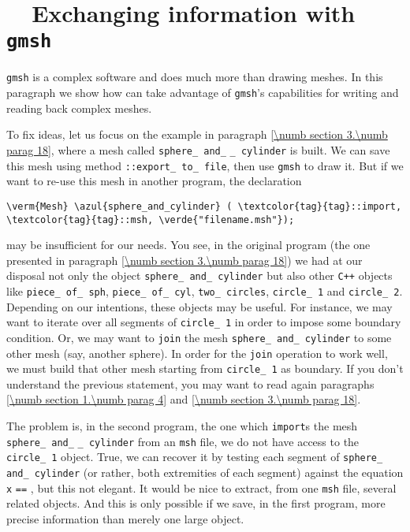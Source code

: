 \section{~~Exchanging information with {\tt gmsh}}\label{\numb section 8.\numb parag 2}

{\small\tt gmsh} is a complex software and does much more than drawing meshes.
In this paragraph we show how {\maniFEM} can take advantage of {\small\tt gmsh}'s capabilities
for writing and reading back complex meshes.

To fix ideas, let us focus on the example in paragraph \ref{\numb section 3.\numb parag 18},
where a mesh called {\small\tt sphere\_\,and\_} {\small\tt\_\,cylinder} is built.
We can save this mesh using method {\small\tt{}::export\_\,to\_\,file}, then use
{\small\tt gmsh} to draw it.
But if we want to re-use this mesh in another {\maniFEM} program, the declaration

\begin{Verbatim}[commandchars=\\\{\},formatcom=\small\tt,
   baselinestretch=0.94,framesep=2mm                     ]
   \verm{Mesh} \azul{sphere_and_cylinder} ( \textcolor{tag}{tag}::import, \textcolor{tag}{tag}::msh, \verde{"filename.msh"});
\end{Verbatim}

\noindent may be insufficient for our needs.
You see, in the original program (the one presented in paragraph
\ref{\numb section 3.\numb parag 18}) we had at our disposal not only the {\small\tt{}}
object {\small\tt sphere\_\,and\_\,cylinder} but also other {\tt C++} objects like
{\small\tt piece\_\,of\_\,sph}, {\small\tt piece\_\,of\_\,cyl}, {\small\tt two\_\,circles},
{\small\tt circle\_\,1} and {\small\tt circle\_\,2}.
Depending on our intentions, these objects may be useful.
For instance, we may want to iterate over all segments of {\small\tt circle\_\,1} in order to
impose some boundary condition.
Or, we may want to {\small\tt join} the mesh {\small\tt sphere\_\,and\_\,cylinder} to some
other mesh (say, another sphere).
In order for the {\small\tt join} operation to work well, we must build that other
mesh starting from {\small\tt circle\_\,1} as boundary.
If you don't understand the previous statement, you may want to read again paragraphs
\ref{\numb section 1.\numb parag 4} and \ref{\numb section 3.\numb parag 18}.

The problem is, in the second {\maniFEM} program, the one which {\small\tt import}s the mesh
{\small\tt sphere\_\,and\_} {\small\tt\_\,cylinder} from an {\small\tt msh} file,
we do not have access to the {\small\tt circle\_\,1} object.
True, we can recover it by testing each segment of {\small\tt sphere\_\,and\_\,cylinder}
(or rather, both extremities of each segment) against the equation {\small\tt x} {\small\tt ==}
{\small\tt{}}, but this not elegant.
It would be nice to extract, from one {\small\tt msh} file, several related
{\small\tt{}} objects.
And this is only possible if we save, in the first {\maniFEM} program, more precise information
than merely one large {\small\tt{}} object.

